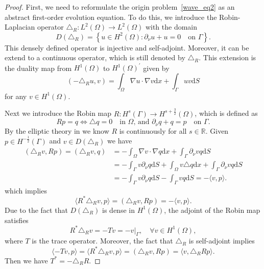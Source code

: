 \documentclass{elsarticle}
\begin{document}
\begin{proof}
First, we need to reformulate the origin problem~\eqref{wave_eq2} as an abstract first-order evolution equation. To do this, we introduce the Robin-Laplacian operator $\triangle_R: L^{2}(\Omega) \rightarrow L^2(\Omega)$ with the domain
\[
	D(\triangle_R) = \left\{ u\in H^2(\Omega): \partial_{\nu} u + u = 0\quad  \textrm{on $\Gamma$}\right\}.
\]
This densely defined operator is injective and self-adjoint. Moreover, it can be extend to a continuous operator,  which is still denoted by $\triangle_R$. This extension is the duality map from $ H^{1}(\Omega)$ to $ H^1(\Omega)^{\prime}$ given by
\[
	(-\triangle_R u, v) = \int_{\Omega}\nabla u\cdot \nabla v \mathrm{d}x + \int_{\Gamma}uv\mathrm{d}S
\]
for any $v\in H^{1}(\Omega)$.

Next we introduce the Robin map $R: H^{s}(\Gamma)\rightarrow H^{s+\frac{3}{2}}(\Omega)$, which is defined as
\[
	Rp = q \Longleftrightarrow \triangle q = 0\quad \textrm{in $\Omega$, and }  \partial_{\nu} q + q = p \quad \textrm{on $\Gamma$}.
\] 
By the elliptic theory in \cite{lions2012non} we know $R$ is continuously for all $s\in\mathbb{ R}$.
Given $p\in H^{-\frac{1}{2}}(\Gamma)$ and $v\in D(\triangle_{R})$ we have
\begin{equation*}
\begin{split}
	(\triangle_{R}v, Rp)  = (\triangle_{R}v, q) &= - \int_{\Omega}\nabla v\cdot \nabla q \mathrm{d}x + \int_{\Gamma}\partial_{\nu}v q\mathrm{d}S\\
	&= - \int_{\Gamma} v \partial_{\nu}q \mathrm{d}S + \int_{\Omega}v\triangle q \mathrm{d}x + \int_{\Gamma}\partial_{\nu}v q\mathrm{d}S \\
	&=- \int_{\Gamma} v \partial_{\nu}q \mathrm{d}S - \int_{\Gamma}v q\mathrm{d}S = -\langle v, p \rangle.
\end{split}
\end{equation*}
which implies
\[
	\langle R^{\ast}\triangle_{R}v, p \rangle = (\triangle_{R}v, Rp) = -\langle v, p \rangle.
\]
Due to the fact that $D(\triangle_R)$ is dense in $H^1(\Omega)$, the adjoint of the Robin map satisfies
\[
	R^{\ast}\triangle_{R}v = -T v = -v|_{\Gamma}, \quad \forall v\in H^1(\Omega),
\]
where $T$ is the trace operator.
Moreover, the fact that $\triangle_{R}$ is self-adjoint implies
\[
	\langle -Tv, p \rangle= \langle R^{\ast}\triangle_{R}v, p \rangle = (\triangle_{R}v, Rp)  = \langle v,\triangle_{R}Rp \rangle.
\]
Then we have $ T^\ast= - \triangle_{R}R$.


\end{proof}
\end{document}
